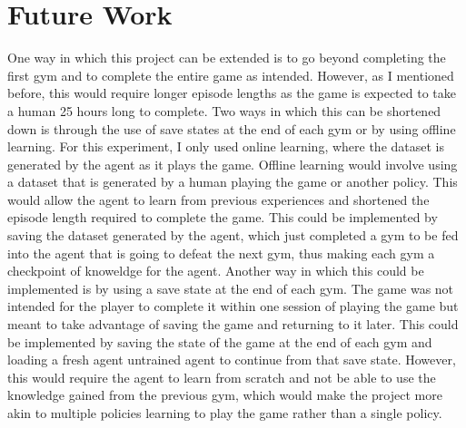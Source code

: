 \section{Future Work}

One way in which this project can be extended is to go beyond completing the first gym and to complete the entire game as intended. However, as I mentioned before, this would require longer episode lengths as the game is expected to take a human 25 hours long to complete. Two ways in which this can be shortened down is through the use of save states at the end of each gym or by using offline learning. For this experiment, I only used online learning, where the dataset is generated by the agent as it plays the game. Offline learning would involve using a dataset that is generated by a human playing the game or another policy. This would allow the agent to learn from previous experiences and shortened the episode length required to complete the game. This could be implemented by saving the dataset generated by the agent, which just completed a gym to be fed into the agent that is going to defeat the next gym, thus making each gym a checkpoint of knoweldge for the agent. Another way in which this could be implemented is by using a save state at the end of each gym. The game was not intended for the player to complete it within one session of playing the game but meant to take advantage of saving the game and returning to it later. This could be implemented by saving the state of the game at the end of each gym and loading a fresh agent untrained agent to continue from that save state. However, this would require the agent to learn from scratch and not be able to use the knowledge gained from the previous gym, which would make the project more akin to multiple policies learning to play the game rather than a single policy. 